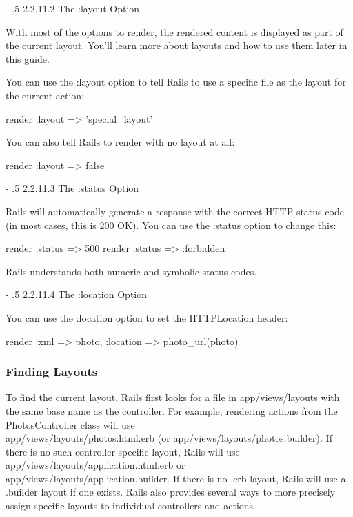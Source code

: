 \documentclass[10pt]{book}
\makeatletter
\renewcommand\paragraph{%
   \@startsection{paragraph}{4}{0mm}%
      {-\baselineskip}%
      {.5\baselineskip}%
      {\normalfont\scriptsize\bfseries}}
\newenvironment{code}{%
  \scriptsize
    \verbatim
}{%
    \endverbatim
    \newline
}
\makeatother
\begin{document}
\paragraph{2.2.11.2 The :layout Option}

With most of the options to render, the rendered content is  displayed as part of the current layout. You’ll learn more about layouts  and how to use them later in this guide.

You can use the :layout option to tell Rails to use a specific file as the layout for the current action:
\begin{code}
render :layout => 'special_layout'
\end{code}

You can also tell Rails to render with no layout at all:
\begin{code}
render :layout => false
\end{code}

\paragraph{2.2.11.3 The :status Option}

Rails will automatically generate a response with the correct HTTP status code (in most cases, this is 200 OK). You can use the :status option to change this:
\begin{code}
render :status => 500
render :status => :forbidden
\end{code}

Rails understands both numeric and symbolic status codes.

\paragraph{2.2.11.4 The :location Option}

You can use the :location option to set the HTTPLocation header:
\begin{code}
render :xml => photo, :location => photo_url(photo)
\end{code}

\subsubsection{ Finding Layouts}

To find the current layout, Rails first looks for a file in app/views/layouts with the same base name as the controller. For example, rendering actions from the PhotosController class will use \\ app/views/layouts/photos.html.erb (or app/views/layouts/photos.builder). If there is no such controller-specific layout, Rails will use \\ app/views/layouts/application.html.erb or \\ app/views/layouts/application.builder. If there is no .erb layout, Rails will use a .builder  layout if one exists. Rails also provides several ways to more  precisely assign specific layouts to individual controllers and actions.
\end{document}
